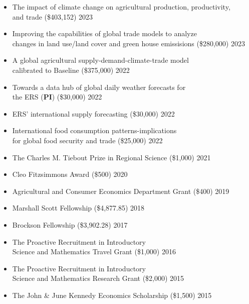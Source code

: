 \documentclass[11pt]{article}
\newenvironment{innerlist}[1][\enskip\textbullet]%
        {\begin{itemize}[#1,leftmargin=*,parsep=0pt,itemsep=0pt,topsep=0pt,partopsep=0pt]}
        {\end{itemize}}
\begin{document}
\begin{innerlist}
	\item The impact of climate change on agricultural production, productivity, \\
	and trade (\$403,152)
	\hfill 2023

	\item Improving the capabilities of global trade models to analyze \\
	changes in land use/land cover and green house emissisions (\$280,000)
	\hfill 2023

	\item A global agricultural supply-demand-climate-trade model \\
	calibrated to Baseline  (\$375,000)
	\hfill 2022

	\item Towards a data hub of global daily weather forecasts for \\
	the ERS (\textbf{PI}) (\$30,000)
	\hfill 2022%

	\item ERS' international supply forecasting (\$30,000)
	\hfill 2022

	\item International food consumption patterns-implications \\
	for global food security and trade (\$25,000)
	\hfill 2022

	\item The Charles M. Tiebout Prize in Regional Science (\$1,000)
	\hfill 2021

	\item Cleo Fitzsimmons Award  (\$500)
	\hfill 2020

	\item Agricultural and Consumer Economics Department Grant (\$400)
	\hfill 2019

	\item Marshall Scott Fellowship (\$4,877.85)
	\hfill 2018

	\item Brockson Fellowship (\$3,902.28) \hfill 2017

	\item The Proactive Recruitment in Introductory \\
	Science and Mathematics Travel Grant (\$1,000)
	\hfill 2016

	\item The Proactive Recruitment in Introductory \\
	Science and Mathematics Research Grant (\$2,000)
	\hfill 2015

	\item The John \& June Kennedy Economics Scholarship (\$1,500)
	\hfill 2015


\end{innerlist}
\end{document}
